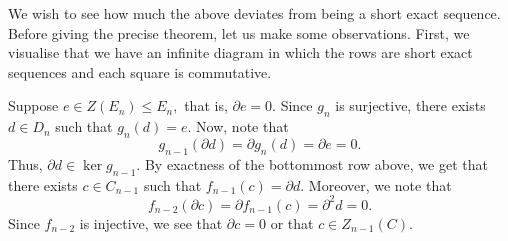 \documentclass[12pt]{article}
\begin{document}
We wish to see how much the above deviates from being a short exact sequence. Before giving the precise theorem, let us make some observations. First, we visualise that we have an infinite diagram in which the rows are short exact sequences and each square is commutative.

\begin{center}
\end{center}

Suppose $e \in Z(E_n) \le E_n,$ that is, $\partial e = 0.$ Since $g_n$ is surjective, there exists $d \in D_n$ such that $g_n(d) = e.$ Now, note that
\begin{equation*} 
	g_{n-1}(\partial d) = \partial g_n(d) = \partial e = 0.
\end{equation*}
Thus, $\partial d \in \ker g_{n-1}.$ By exactness of the bottommost row above, we get that there exists $c \in C_{n-1}$ such that $f_{n-1}(c) = \partial d.$ Moreover, we note that
\begin{equation*} 
	f_{n-2}(\partial c) = \partial f_{n-1}(c) = \partial^2 d = 0.
\end{equation*}
Since $f_{n-2}$ is injective, we see that $\partial c = 0$ or that $c \in Z_{n-1}(C).$
\end{document}
